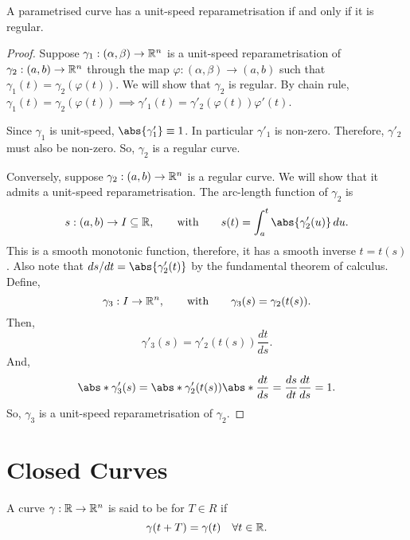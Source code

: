 \documentclass[11pt]{penrose}
\begin{document}
\begin{nthm}
    A parametrised curve has a unit-speed reparametrisation if and only if it is regular.
\end{nthm}
\begin{proof}
    Suppose $\gamma_1 : (\alpha, \beta) \to \mathbb{R}^n$ is a unit-speed reparametrisation of $\gamma_2 : (a,b) \to \mathbb{R}^n$ through the map $\varphi : (\alpha, \beta) \to (a, b)$ such that $\gamma_1 (t) = \gamma_2 (\varphi(t))$. We will show that $\gamma_2$ is regular. By chain rule, $\gamma_1 (t) = \gamma_2 (\varphi(t)) \implies \gamma'_1 (t) = \gamma'_2 (\varphi(t)) \varphi'(t)$.

    Since $\gamma_1$ is unit-speed, $\abs{\gamma'_1} \equiv 1$. In particular $\gamma'_1$ is non-zero. Therefore, $\gamma'_2$ must also be non-zero. So, $\gamma_2$ is a regular curve.

    Conversely, suppose $\gamma_2 : (a,b) \to \mathbb{R}^n$ is a regular curve. We will show that it admits a unit-speed reparametrisation. The arc-length function of $\gamma_2$ is
    \begin{equation}
        s : (a,b) \to I \subseteq \R,
        \qquad\text{with}\qquad
        s(t) = \int_a^t \abs{\gamma'_2 (u)} \,du.
    \end{equation}
    This is a smooth monotonic function, therefore, it has a smooth inverse $t = t(s)$. Also note that $ds/dt = \abs{\gamma'_2 (t)}$ by the fundamental theorem of calculus. Define,
    \begin{equation}
        \gamma_3 : I \to \mathbb{R}^n,
        \qquad\text{with}\qquad
        \gamma_3 (s) = \gamma_2 (t(s)).
    \end{equation}
    Then,
    \begin{equation}
        \gamma'_3 (s) = \gamma'_2 (t(s)) \frac{dt}{ds}.
    \end{equation}
    And,
    \begin{equation}
        \abs*{\gamma'_3 (s)}
        = \abs*{\gamma'_2 (t(s))} \abs*{\frac{dt}{ds}}
        = \frac{ds}{dt} \frac{dt}{ds}
        = 1.
    \end{equation}
    So, $\gamma_3$ is a unit-speed reparametrisation of $\gamma_2$.
\end{proof}

\section{Closed Curves}
\begin{ndfn}
    A curve $\gamma : \mathbb{R} \to \mathbb{R}^n$ is said to be  for $T \in R$ if
    \begin{equation}
        \gamma(t + T) = \gamma(t)
        \quad\forall t \in \mathbb{R}.
    \end{equation}
\end{ndfn}
\end{document}
